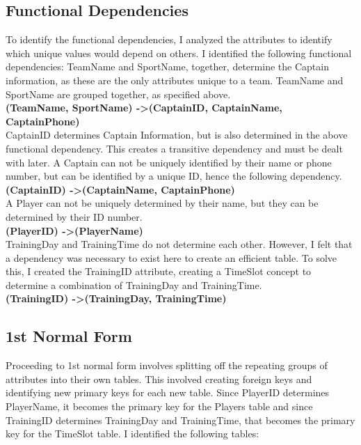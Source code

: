 \documentclass[11pt, article]{article}
\begin{document}
 \subsection{Functional Dependencies}
To identify the functional dependencies, I analyzed the attributes to identify which unique values would depend on others. I identified the following functional dependencies: \newline \newline
TeamName and SportName, together, determine the Captain information, as these are the only attributes unique to a team. TeamName and SportName are grouped together, as specified above.\\
\textbf{(TeamName, SportName) -\textgreater (CaptainID, CaptainName, CaptainPhone)} \newline \\
CaptainID determines Captain Information, but is also determined in the above functional dependency. This creates a transitive dependency and must be dealt with later. A Captain can not be uniquely identified by their name or phone number, but can be identified by a unique ID, hence the following dependency. \\
\textbf{(CaptainID) -\textgreater (CaptainName, CaptainPhone)} \newline \\
A Player can not be uniquely determined by their name, but they can be determined by their ID number.  \\
\textbf{(PlayerID) -\textgreater (PlayerName)} \newline \\
TrainingDay and TrainingTime do not determine each other. However, I felt that a dependency was necessary to exist here to create an efficient table. To solve this, I created the TrainingID attribute, creating a TimeSlot concept to determine a combination of TrainingDay and TrainingTime. \\ 
\textbf{(TrainingID) -\textgreater  (TrainingDay, TrainingTime)} \newline \\
\newpage
\subsection{1st Normal Form}

Proceeding to 1st normal form involves splitting off the repeating groups of attributes into their own tables. This involved creating foreign keys and identifying new primary keys for each new table. Since PlayerID determines PlayerName, it becomes the primary key for the Players table and since TrainingID determines TrainingDay and TrainingTime, that becomes the primary key for the TimeSlot table. I identified the following tables:
\end{document}
